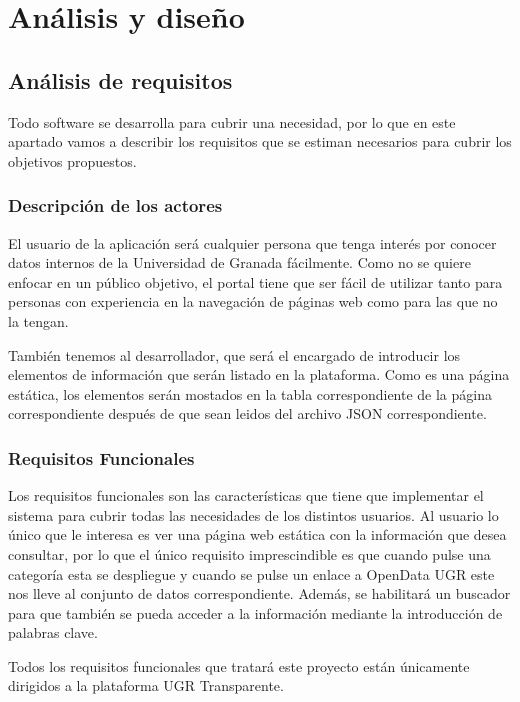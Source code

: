 \chapter{Análisis y diseño}

\section{Análisis de requisitos}

Todo software se desarrolla para cubrir una necesidad, por lo que en este apartado vamos a describir los requisitos que se 
estiman necesarios para cubrir los objetivos propuestos.

\subsection{Descripción de los actores}

El usuario de la aplicación será cualquier persona que tenga interés por conocer datos internos de la Universidad de Granada 
fácilmente. Como no se quiere enfocar en un público objetivo, el portal tiene que ser fácil de utilizar tanto para personas 
con experiencia en la navegación de páginas web como para las que no la tengan.

\bigskip
También tenemos al desarrollador, que será el encargado de introducir los elementos de información que serán listado en la
plataforma. Como es una página estática, los elementos serán mostados en la tabla correspondiente de la página correspondiente
después de que sean leidos del archivo JSON correspondiente.

\subsection{Requisitos Funcionales}

Los requisitos funcionales son las características que tiene que implementar el sistema para cubrir todas las necesidades de 
los distintos usuarios. Al usuario lo único que le interesa es ver una página web estática con la información que desea 
consultar, por lo que el único requisito imprescindible es que cuando pulse una categoría esta se despliegue y cuando se 
pulse un enlace a OpenData UGR este nos lleve al conjunto de datos correspondiente. Además, se habilitará un buscador para que
también se pueda acceder a la información mediante la introducción de palabras clave. 

\newpage
Todos los requisitos funcionales que tratará este proyecto están únicamente dirigidos a la plataforma UGR Transparente.

